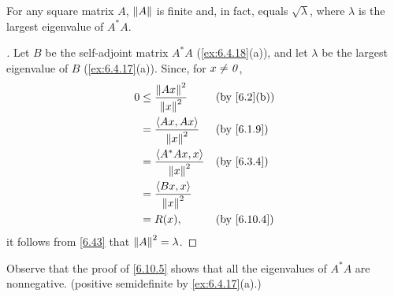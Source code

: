 \begin{cor}\label{6.10.5}
  For any square matrix \(A\), \(\left\lVert A\right\rVert\) is finite and, in fact, equals \(\sqrt{\lambda}\), where \(\lambda\) is the largest eigenvalue of \(A^* A\).
\end{cor}

\begin{proof}[]
  Let \(B\) be the self-adjoint matrix \(A^* A\) (\cref{ex:6.4.18}(a)), and let \(\lambda\) be the largest eigenvalue of \(B\) (\cref{ex:6.4.17}(a)).
  Since, for \(x \neq \mathit{0}\),
  \begin{align*}
    0 & \leq \dfrac{\norm{Ax}^2}{\norm{x}^2}   &  & \by{6.2}[b] \\
      & = \dfrac{\inn{Ax, Ax}}{\norm{x}^2}     &  & \by{6.1.9}  \\
      & = \dfrac{\inn{A^* A x, x}}{\norm{x}^2} &  & \by{6.3.4}  \\
      & = \dfrac{\inn{Bx, x}}{\norm{x}^2}                       \\
      & = R(x),                                &  & \by{6.10.4}
  \end{align*}
  it follows from \cref{6.43} that \(\left\lVert A\right\rVert^2 = \lambda\).
\end{proof}

\begin{note}
  Observe that the proof of \cref{6.10.5} shows that all the eigenvalues of \(A^* A\) are nonnegative.
  (positive semidefinite by \cref{ex:6.4.17}(a).)
\end{note}
